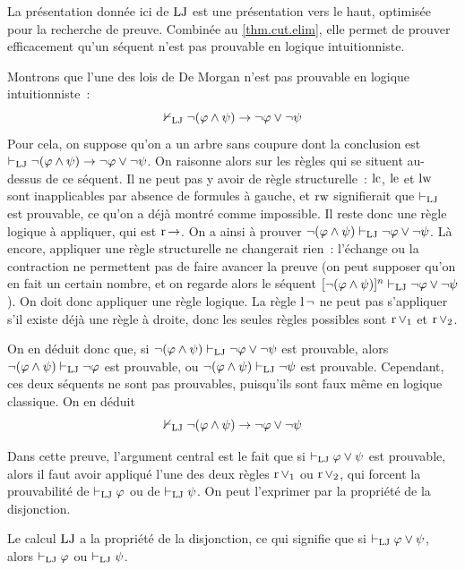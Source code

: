 La présentation donnée ici de $\operatorname{LJ}$ est une présentation vers le haut,
optimisée pour la recherche de preuve. Combinée au \cref{thm.cut.elim}, elle
permet de prouver efficacement qu'un séquent n'est pas prouvable en logique
intuitionniste.

\begin{example}
  Montrons que l'une des lois de De Morgan n'est pas prouvable en logique
  intuitionniste~:
  \[\nvdash_{\operatorname{LJ}} \lnot (\varphi \land \psi) \to \lnot \varphi \lor \lnot \psi\]
  Pour cela, on suppose qu'on a un arbre sans coupure dont la conclusion est
  $\vdash_{\operatorname{LJ}}\lnot(\varphi\land\psi)\to\lnot\varphi\lor\lnot\psi$. On raisonne
  alors sur les règles qui se situent au-dessus de ce séquent. Il ne peut pas y
  avoir de règle structurelle~: $\operatorname{lc}$, $\operatorname{le}$ et $\operatorname{lw}$ sont inapplicables par
  absence de formules à gauche, et $\operatorname{rw}$ signifierait que $\vdash_{\operatorname{LJ}}$ est
  prouvable, ce qu'on a déjà montré comme impossible. Il reste donc une
  règle logique à appliquer, qui est $\operatorname{r}\mathord{\to}$.
  On a ainsi à prouver
  $\lnot(\varphi\land\psi)\vdash_{\operatorname{LJ}}\lnot\varphi\lor\lnot\psi$.
  Là encore, appliquer une règle structurelle ne changerait rien~:
  l'échange ou la contraction ne permettent pas de faire avancer la preuve
  (on peut supposer qu'on en fait un certain nombre, et on regarde alors le
  séquent $[\lnot(\varphi\land\psi)]^n\vdash_{\operatorname{LJ}}\lnot\varphi\lor\lnot\psi$). On
  doit donc appliquer une règle logique. La règle $\operatorname{l}\mathord{\lnot}$ ne peut pas
  s'appliquer s'il existe déjà une règle à droite, donc les seules règles
  possibles sont $\operatorname{r}\mathord{\lor}_{1}$ et $\operatorname{r}\mathord{\lor}_{2}$.

  On en déduit donc que, si
  $\lnot(\varphi\land\psi)\vdash_{\operatorname{LJ}}\lnot\varphi\lor\lnot\psi$ est prouvable,
  alors
  $\lnot(\varphi\land\psi)\vdash_{\operatorname{LJ}}\lnot\varphi$ est prouvable, ou
  $\lnot(\varphi\land\psi)\vdash_{\operatorname{LJ}}\lnot\psi$ est prouvable. Cependant, ces
  deux séquents ne sont pas prouvables, puisqu'ils sont faux même en
  logique classique. On en déduit
  \[\nvdash_{\operatorname{LJ}} \lnot (\varphi \land \psi) \to \lnot \varphi \lor \lnot \psi\]
\end{example}

Dans cette preuve, l'argument central est le fait que si
$\vdash_{\operatorname{LJ}}\varphi\lor\psi$ est prouvable, alors il faut avoir appliqué l'une des
deux règles $\operatorname{r}\mathord{\lor}_{1}$ ou $\operatorname{r}\mathord{\lor}_{2}$, qui forcent la prouvabilité de
$\vdash_{\operatorname{LJ}}\varphi$ ou de $\vdash_{\operatorname{LJ}}\psi$. On peut l'exprimer par la propriété de la
disjonction.

\begin{property}[Disjonction]
  Le calcul $\operatorname{LJ}$ a la propriété de la disjonction, ce qui signifie que si
  $\vdash_{\operatorname{LJ}}\varphi \lor \psi$, alors $\vdash_{\operatorname{LJ}}\varphi$ ou $\vdash_{\operatorname{LJ}}\psi$.
\end{property}

